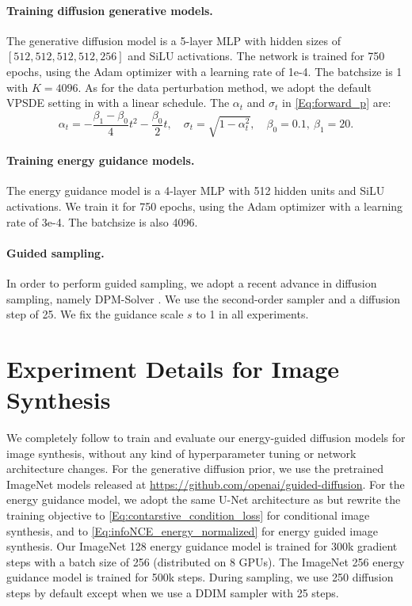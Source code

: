 \paragraph{Training diffusion generative models.}
The generative diffusion model is a 5-layer MLP with hidden sizes of $[512, 512, 512, 512, 256]$ and SiLU activations. The network is trained for 750 epochs, using the Adam optimizer with a learning rate of 1e-4. The batchsize is 1 with $K=4096$. As for the data perturbation method, we adopt the default VPSDE setting in \citep{song2020score} with a linear schedule. The $\alpha_t$ and $\sigma_t$ in \eqref{Eq:forward_p} are:
\begin{equation}
    \alpha_t = -\frac{\beta_1 - \beta_0}{4}t^2 - \frac{\beta_0}{2}t, \quad \sigma_t = \sqrt{1 - \alpha_t^2}, \quad \beta_0=0.1,\ \beta_1=20.
\end{equation}


\paragraph{Training energy guidance models.}
The energy guidance model is a 4-layer MLP with 512 hidden units and SiLU activations. We train it for 750 epochs, using the Adam optimizer with a learning rate of 3e-4. The batchsize is also 4096.

\paragraph{Guided sampling.}
 In order to perform guided sampling, we adopt a recent advance in diffusion sampling, namely DPM-Solver \citep{lu2022dpm}. We use the second-order sampler and a diffusion step of 25. We fix the guidance scale $s$ to 1 in all experiments.

\section{Experiment Details for Image Synthesis}
We completely follow \citet{diffusion_beat_gan} to train and evaluate our energy-guided diffusion models for image synthesis, without any kind of hyperparameter tuning or network architecture changes. For the generative diffusion prior, we use the pretrained ImageNet models released at \url{https://github.com/openai/guided-diffusion}. For the energy guidance model, we adopt the same U-Net architecture as \citet{diffusion_beat_gan} but rewrite the training objective to \eqref{Eq:contarstive_condition_loss} for conditional image synthesis, and to \eqref{Eq:infoNCE_energy_normalized} for energy guided image synthesis. Our ImageNet 128 energy guidance model is trained for 300k gradient steps with a batch size of 256 (distributed on 8 GPUs). The ImageNet 256 energy guidance model is trained for 500k steps. During sampling, we use 250 diffusion steps by default except when we use a DDIM \citep{song2020denoising} sampler with 25 steps. 

